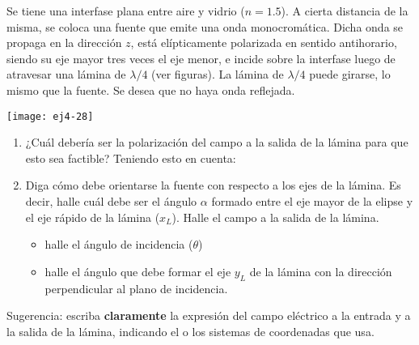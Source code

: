 \item
\begin{minipage}[t][4cm]{0.55\textwidth}
Se tiene una interfase plana entre aire y vidrio ($n = \num{1.5}$).
A cierta distancia de la misma, se coloca una fuente que emite una onda monocromática.
Dicha onda se propaga en la dirección $z$, está elípticamente polarizada en sentido antihorario, siendo su eje mayor tres veces el eje menor, e incide sobre la interfase luego de atravesar una lámina de \(\lambda/4\) (ver figuras).
La lámina de \(\lambda/4\) puede girarse, lo mismo que la fuente.
Se desea que no haya onda reflejada.
\end{minipage}
\begin{minipage}[c][-1cm][t]{0.4\textwidth}
	\texttt{[image: ej4-28]}
\end{minipage}
\begin{enumerate}
	\item ¿Cuál debería ser la polarización del campo a la salida de la lámina para que esto sea factible?
	Teniendo esto en cuenta:
	\item Diga cómo debe orientarse la fuente con respecto a los ejes de la lámina.
	Es decir, halle cuál debe ser el ángulo $\alpha$ formado entre el eje mayor de la elipse y el eje rápido de la lámina ($x_{L}$).
	Halle el campo a la salida de la lámina.
	\begin{itemize}
		\item halle el ángulo de incidencia ($\theta$)
		\item halle el ángulo que debe formar el eje $y_L$ de la lámina con la dirección perpendicular al plano de incidencia. 
	\end{itemize}
\end{enumerate}
Sugerencia: escriba \textbf{claramente} la expresión del campo eléctrico a la entrada y a la salida de la lámina, indicando el o los sistemas de coordenadas que usa.
